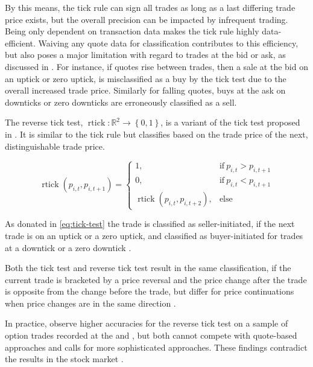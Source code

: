 By this means, the tick rule can sign all trades as long as a last differing trade price exists, but the overall precision can be impacted by infrequent trading. Being only dependent on transaction data makes the tick rule highly data-efficient. Waiving any quote data for classification contributes to this efficiency, but also poses a major limitation with regard to trades at the bid or ask, as discussed in \textcite[][557--558]{finucaneDirectTestMethods2000}. For instance, if quotes rise between trades, then a sale at the bid on an uptick or zero uptick, is misclassified as a buy by the tick test due to the overall increased trade price. Similarly for falling quotes, buys at the ask on downticks or zero downticks are erroneously classified as a sell.

The reverse tick test, $\operatorname{rtick} \colon \mathbb{R}^2 \to \left\{0, 1\right\}$, is a variant of the tick test proposed in \textcite[][241]{hasbrouckTradesQuotesInventories1988}. It is similar to the tick rule but classifies based on the trade price of the next, distinguishable trade price.

\begin{equation}
  \operatorname{rtick}(p_{i, t}, p_{i,t+1})=
  \begin{cases}
    1,                                        & \text{if}\ p_{i, t} > p_{i, t+1} \\
    0,                                        & \text{if}\ p_{i, t} < p_{i, t+1} \\
    \operatorname{rtick}(p_{i,t}, p_{i,t+2}), & \text{else}
  \end{cases}
  \label{eq:reverse-tick-test}
\end{equation}

As donated in \cref{eq:tick-test} the trade is classified as seller-initiated, if the next trade is on an uptick or a zero uptick, and classified as buyer-initiated for trades at a downtick or a zero downtick \autocite[][735--636]{leeInferringTradeDirection1991}.

Both the tick test and reverse tick test result in the same classification, if the current trade is bracketed by a price reversal and the price change after the trade is opposite from the change before the trade, but differ for price continuations when price changes are in the same direction \autocite[][736]{leeInferringTradeDirection1991}.

In practice, \textcite[][29--32]{grauerOptionTradeClassification2022} observe higher accuracies for the reverse tick test on a sample of option trades recorded at the  and , but both cannot compete with quote-based approaches and calls for more sophisticated approaches. These findings contradict the results in the stock market \autocite[][737]{leeInferringTradeDirection1991}.

